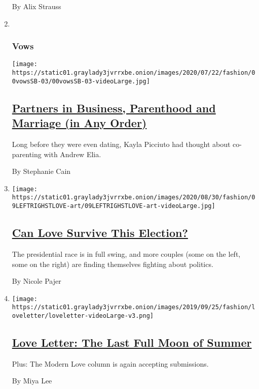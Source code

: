 \begin{enumerate}
  By Alix Strauss
\item ~
  \hypertarget{vows-3}{%
  \subsubsection{Vows}\label{vows-3}}

  \texttt{[image: https://static01.graylady3jvrrxbe.onion/images/2020/07/22/fashion/00vowsSB-03/00vowsSB-03-videoLarge.jpg]}

  \hypertarget{partners-in-business-parenthood-and-marriage-in-any-order}{%
  \subsection{\texorpdfstring{\href{/2020/08/26/fashion/weddings/partners-in-business-parenthood-and-marriage-in-any-order.html}{Partners
  in Business, Parenthood and Marriage (in Any
  Order)}}{Partners in Business, Parenthood and Marriage (in Any Order)}}\label{partners-in-business-parenthood-and-marriage-in-any-order}}

  Long before they were even dating, Kayla Picciuto had thought about
  co-parenting with Andrew Elia.

  By Stephanie Cain
\item
  \texttt{[image: https://static01.graylady3jvrrxbe.onion/images/2020/08/30/fashion/09LEFTRIGHSTLOVE-art/09LEFTRIGHSTLOVE-art-videoLarge.jpg]}

  \hypertarget{can-love-survive-this-election}{%
  \subsection{\texorpdfstring{\href{/2020/08/25/fashion/weddings/can-love-relationships-survive-this-election.html}{Can
  Love Survive This
  Election?}}{Can Love Survive This Election?}}\label{can-love-survive-this-election}}

  The presidential race is in full swing, and more couples (some on the
  left, some on the right) are finding themselves fighting about
  politics.

  By Nicole Pajer
\item
  \texttt{[image: https://static01.graylady3jvrrxbe.onion/images/2019/09/25/fashion/loveletter/loveletter-videoLarge-v3.png]}

  \hypertarget{love-letter-the-last-full-moon-of-summer}{%
  \subsection{\texorpdfstring{\href{/2020/09/04/style/love-letter-the-last-full-moon-of-summer-newsletter.html}{Love
  Letter: The Last Full Moon of
  Summer}}{Love Letter: The Last Full Moon of Summer}}\label{love-letter-the-last-full-moon-of-summer}}

  Plus: The Modern Love column is again accepting submissions.

  By Miya Lee
\end{enumerate}


